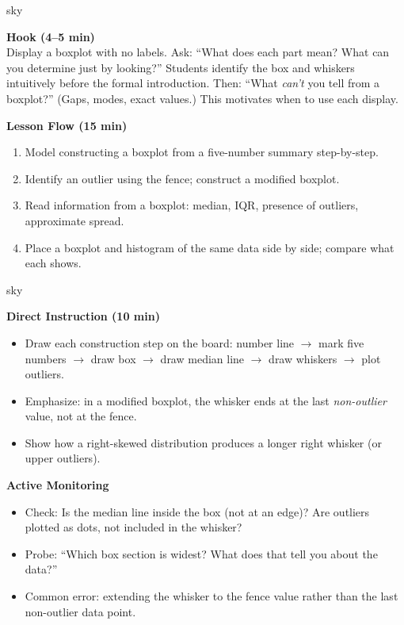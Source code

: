 \documentclass[10pt]{article}
\begin{document}
\boxguard
\begin{skillbox}{sky}
\begin{minipage}[t]{0.48\linewidth}
    \textbf{Hook (4--5 min)}\\
    Display a boxplot with no labels. Ask: ``What does each part mean? What can you determine just by looking?'' Students identify the box and whiskers intuitively before the formal introduction. Then: ``What \textit{can't} you tell from a boxplot?'' (Gaps, modes, exact values.) This motivates when to use each display.
\end{minipage}
\hfill
\begin{minipage}[t]{0.48\linewidth}
    \textbf{Lesson Flow (15 min)}
    \begin{enumerate}
        \item Model constructing a boxplot from a five-number summary step-by-step.
        \item Identify an outlier using the fence; construct a modified boxplot.
        \item Read information from a boxplot: median, IQR, presence of outliers, approximate spread.
        \item Place a boxplot and histogram of the same data side by side; compare what each shows.
    \end{enumerate}
\end{minipage}
\end{skillbox}

\boxguard
\begin{skillbox}{sky}
\begin{minipage}[t]{0.48\linewidth}
    \textbf{Direct Instruction (10 min)}
    \begin{itemize}
        \item Draw each construction step on the board: number line $\to$ mark five numbers $\to$ draw box $\to$ draw median line $\to$ draw whiskers $\to$ plot outliers.
        \item Emphasize: in a modified boxplot, the whisker ends at the last \textit{non-outlier} value, not at the fence.
        \item Show how a right-skewed distribution produces a longer right whisker (or upper outliers).
    \end{itemize}
\end{minipage}
\hfill
\begin{minipage}[t]{0.48\linewidth}
    \textbf{Active Monitoring}
    \begin{itemize}
        \item Check: Is the median line inside the box (not at an edge)? Are outliers plotted as dots, not included in the whisker?
        \item Probe: ``Which box section is widest? What does that tell you about the data?''
        \item Common error: extending the whisker to the fence value rather than the last non-outlier data point.
    \end{itemize}
\end{minipage}
\end{skillbox}
\end{document}
